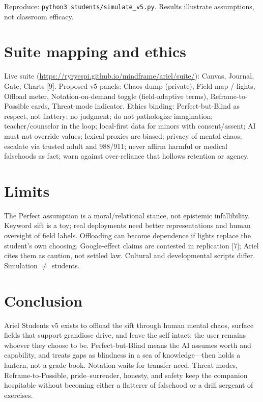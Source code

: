 \documentclass[11pt, a4paper]{article}
\begin{document}
Reproduce: \texttt{python3 students/simulate\_v5.py}. Results illustrate assumptions, not classroom efficacy.

\section{Suite mapping and ethics}
Live suite (\url{https://ryryespi.github.io/mindframe/ariel/suite/}): Canvas, Journal, Gate, Charts [9]. Proposed v5 panels: Chaos dump (private), Field map / lights, Offload meter, Notation-on-demand toggle (field-adaptive terms), Reframe-to-Possible cards, Threat-mode indicator. Ethics binding: Perfect-but-Blind as respect, not flattery; no judgment; do not pathologize imagination; teacher/counselor in the loop; local-first data for minors with consent/assent; AI must not override values; lexical proxies are biased; privacy of mental chaos; escalate via trusted adult and 988/911; never affirm harmful or medical falsehoods as fact; warn against over-reliance that hollows retention or agency.

\section{Limits}
The Perfect assumption is a moral/relational stance, not epistemic infallibility. Keyword sift is a toy; real deployments need better representations and human oversight of field labels. Offloading can become dependence if lights replace the student's own choosing. Google-effect claims are contested in replication [7]; Ariel cites them as caution, not settled law. Cultural and developmental scripts differ. Simulation $\neq$ students.

\section{Conclusion}
Ariel Students v5 exists to offload the sift through human mental chaos, surface fields that support grandiose drive, and leave the self intact: the user remains whoever they choose to be. Perfect-but-Blind means the AI assumes worth and capability, and treats gaps as blindness in a sea of knowledge---then holds a lantern, not a grade book. Notation waits for transfer need. Threat modes, Reframe-to-Possible, pride--surrender, honesty, and safety keep the companion hospitable without becoming either a flatterer of falsehood or a drill sergeant of exercises.
\end{document}
